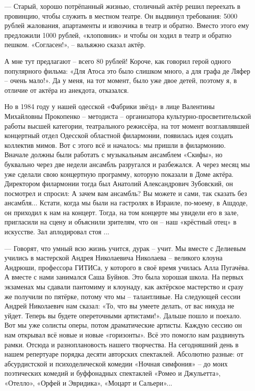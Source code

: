 — Старый, хорошо потрёпанный жизнью, столичный актёр решил переехать в
провинцию, чтобы служить в местном театре. Он выдвинул требования: 5000 рублей
жалования, апартаменты и извозчика в театр и обратно. Вместо этого ему
предложили 1000 рублей, «клоповник» и чтобы он ходил в театр и обратно пешком.
«Согласен!», – вальяжно сказал актёр.

А мне тут предлагают – всего 80 рублей! Короче, как говорил герой одного
популярного фильма: «Для Атоса это было слишком много, а для графа де Ляфер –
очень мало!». Да у меня, на тот момент, было уже двое детей, поэтому я, в
отличие от актёра из анекдота, отказался.

Но в 1984 году у нашей одесской «Фабрики звёзд» в лице Валентины Михайловны
Прокопенко – методиста – организатора культурно-просветительской работы высшей
категории, театрального режиссёра, на тот момент возглавлявшей концертный отдел
Одесской областной филармонии, появилась идея создать коллектив мимов. Вот с
этого всё и началось: мы пришли в филармонию. Вначале должны были работать с
музыкальным ансамблем «Скифы», но буквально через две недели ансамбль
разругался и разбежался. А через месяц мы уже сделали свою концертную
программу, которую показали в Доме актёра. Директором филармонии тогда был
Анатолий Александрович Зубовский, он посмотрел и спросил: А зачем вам ансамбль?
Вы можете и сами, так сказать без ансамбля... Кстати, когда мы были на гастролях
в Израиле, по-моему, в Ашдоде, он приходил к нам на концерт. Тогда, на том
концерте мы увидели его в зале, пригласили на сцену и объяснили зрителям, что
он – наш «крёстный отец» в искусстве. Зал аплодировал стоя ...


— Говорят, что умный всю жизнь учится, дурак – учит. Мы вместе с Делиевым
учились в мастерской Андрея Николаевича Николаева – великого клоуна Андрюши,
профессора ГИТИСа, у которого в своё время училась Алла Пугачёва. А вместе с
нами занимался Саша Буйнов. Это была хорошая школа. На первых экзаменах мы
сдавали пантомиму и клоунаду, как актёрское мастерство и сразу же получили по
пятёрке, потому что мы – талантливые. На следующей сессии Андрей Николаевич нам
сказал: «То, что вы умеете делать, от вас никуда не уйдет. Теперь вы будете
опереточными артистами!». Дальше пошло и поехало. Вот мы уже солисты оперы,
потом драматические артисты. Каждую сессию он нам открывал всё новые и новые
«горизонты». Всё это помогло нам раздвинуть рамки. Отсюда и разноплановость
нашего творчества. На сегодняшний день в нашем репертуаре порядка десяти
авторских спектаклей. Абсолютно разные: от абсурдистской и психоделической
комедии «Ночная симфония» – до моих поэтических комедий и буффонадных
спектаклей «Ромео и Джульетта», «Отелло», «Орфей и Эвридика», «Моцарт и
Сальери»...

